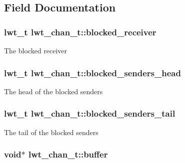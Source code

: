 \subsection{Field Documentation}
\hypertarget{structlwt__channel_ac296e81a0c3bfdccbc1a8c1f89651008}{
\subsubsection[{blocked\+\_\+receiver}]{\setlength{\rightskip}{0pt plus 5cm}lwt\+\_\+t lwt\+\_\+chan\+\_\+t\+::blocked\+\_\+receiver}}\label{structlwt__channel_ac296e81a0c3bfdccbc1a8c1f89651008}
The blocked receiver \hypertarget{structlwt__channel_a34b43c8980f830472deb0cc60a632257}{
\subsubsection[{blocked\+\_\+senders\+\_\+head}]{\setlength{\rightskip}{0pt plus 5cm}lwt\+\_\+t lwt\+\_\+chan\+\_\+t\+::blocked\+\_\+senders\+\_\+head}}\label{structlwt__channel_a34b43c8980f830472deb0cc60a632257}
The head of the blocked senders \hypertarget{structlwt__channel_ad2912304612b27ba7a7b5dd2ec3e2415}{
\subsubsection[{blocked\+\_\+senders\+\_\+tail}]{\setlength{\rightskip}{0pt plus 5cm}lwt\+\_\+t lwt\+\_\+chan\+\_\+t\+::blocked\+\_\+senders\+\_\+tail}}\label{structlwt__channel_ad2912304612b27ba7a7b5dd2ec3e2415}
The tail of the blocked senders \hypertarget{structlwt__channel_a3ab113fcf44dd32e83447f80a9111aa1}{
\subsubsection[{buffer}]{\setlength{\rightskip}{0pt plus 5cm}void$\ast$ lwt\+\_\+chan\+\_\+t\+::buffer}}\label{structlwt__channel_a3ab113fcf44dd32e83447f80a9111aa1}
